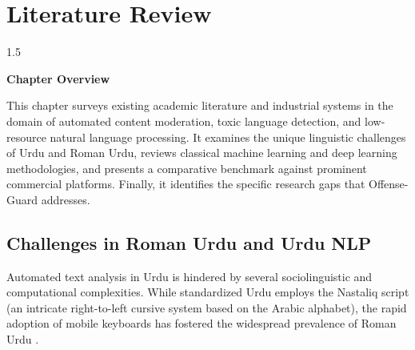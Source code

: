 \documentclass[A4paper,12pt]{report}
\theoremstyle{plain}
\theoremstyle{definition}
\theoremstyle{remark}
\numberwithin{equation}{section}
\begin{document}
\chapter{Literature Review}
\thispagestyle{empty}
\newpage
\begin{spacing}{1.5}

\thispagestyle{empty}

{\centering \Large \bfseries Chapter Overview \par}
\vspace{1cm}

This chapter surveys existing academic literature and industrial systems in the domain of automated content moderation, toxic language detection, and low-resource natural language processing. It examines the unique linguistic challenges of Urdu and Roman Urdu, reviews classical machine learning and deep learning methodologies, and presents a comparative benchmark against prominent commercial platforms. Finally, it identifies the specific research gaps that Offense-Guard addresses.

\end{spacing}

\section{Challenges in Roman Urdu and Urdu NLP}
Automated text analysis in Urdu is hindered by several sociolinguistic and computational complexities. While standardized Urdu employs the Nastaliq script (an intricate right-to-left cursive system based on the Arabic alphabet), the rapid adoption of mobile keyboards has fostered the widespread prevalence of Roman Urdu \cite{ref1,ref3}. 
\end{document}
